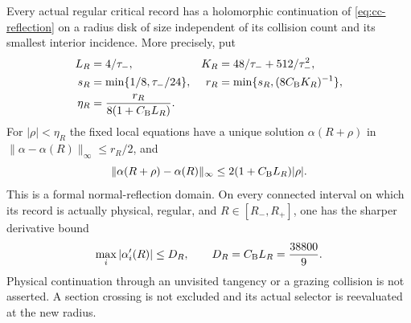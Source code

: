 \begin{theorem}
\label{thm:cc-radius}
Every actual regular critical record has a holomorphic continuation
of \eqref{eq:cc-reflection} on a radius disk of size independent of
its collision count and its smallest interior incidence.  More
precisely, put
\begin{equation}\label{eq:cc-analytic-constants}
 \begin{aligned}
 L_R&=4/\tau_-,& K_R&=48/\tau_-+512/\tau_-^2,\\
 s_R&=\min\{1/8,\tau_-/24\},&
 r_R&=\min\{s_R,(8C_{\rm B}K_R)^{-1}\},\\
 \eta_R&=\frac{r_R}{8(1+C_{\rm B}L_R)}.
 \end{aligned}
\end{equation}
For $|\rho|<\eta_R$ the fixed local equations have a unique solution
$\alpha(R+\rho)$ in
$\|\alpha-\alpha(R)\|_\infty\leq r_R/2$, and
\begin{equation}\label{eq:cc-formal-lift}
 \|\alpha(R+\rho)-\alpha(R)\|_\infty
 \leq 2(1+C_{\rm B}L_R)|\rho|.
\end{equation}
This is a formal normal-reflection domain.  On every connected
interval on which its record is actually physical, regular, and
$R\in[R_-,R_+]$, one has the sharper derivative bound
\begin{equation}\label{eq:cc-radius-derivative}
 \max_i|\alpha_i'(R)|\leq D_R,
 \qquad D_R=C_{\rm B}L_R=\frac{38800}{9}.
\end{equation}
Physical continuation through an unvisited tangency or a grazing
collision is not asserted.  A section crossing is not excluded and
its actual selector is reevaluated at the new radius.
\end{theorem}
